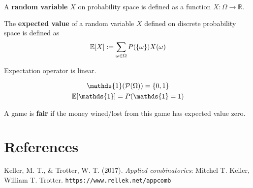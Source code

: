 \documentclass{article}
\def\R{{\mathbb R}}
\begin{document}
		\begin{definition}
			A \textbf{random variable} $X$ on probability space is defined as a function $X: \Omega \to \R$.
		\end{definition}
		
		\begin{definition}
			The \textbf{expected value} of a random variable $X$ defined on discrete probability space is defined as 
			\begin{equation}
				\mathbb{E}[{X}] := \sum_{\omega \in \Omega} P(\{\omega\})X(\omega)
			\end{equation}
		\end{definition}
		
		\begin{proposition}
			Expectation operator is linear.
		\end{proposition}
		
		\begin{proposition}
			\begin{gather}
				\mathds{1}(\mc{P}(\Omega)) = \{0, 1\} \\
				\expect{\mathds{1}} = P(\mathds{1} = 1)
			\end{gather}
		\end{proposition}
		
		\begin{definition}
			A game is \textbf{fair} if the money wined/lost from this game has expected value zero.
		\end{definition}
		

	\newpage
	\section*{References}
		\par Keller, M. T., \& Trotter, W. T. (2017). \emph{Applied combinatorics}: Mitchel T. Keller, William T. Trotter. \texttt{https://www.rellek.net/appcomb}
\end{document}

